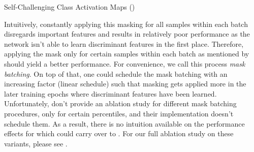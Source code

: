 \begin{algorithm}[t]
    \SetAlgoLined
    \SetNoFillComment
    \BlankLine
\caption{Self-Challenging Class Activation Maps (\scam)}
\label{alg:ActivationMasking}
\end{algorithm}

Intuitively, constantly applying this masking for all samples within each batch disregards important features and results in relatively poor performance as the network isn't able to learn discriminant features in the first place. Therefore, applying the mask only for certain samples within each batch as mentioned by \citet[Secton~3.3]{huang2020selfchallenging} should yield a better performance. For convenience, we call this process \emph{mask batching}. On top of that, one could schedule the mask batching with an increasing factor (\eg linear schedule) such that masking gets applied more in the later training epochs where discriminant features have been learned. Unfortunately, \citet{huang2020selfchallenging} don't provide an ablation study for different mask batching procedures, only for certain percentiles, and their implementation doesn't schedule them. As a result, there is no intuition available on the performance effects for \rsc which could carry over to \scam. For our full ablation study on these \scam variants, please see .

